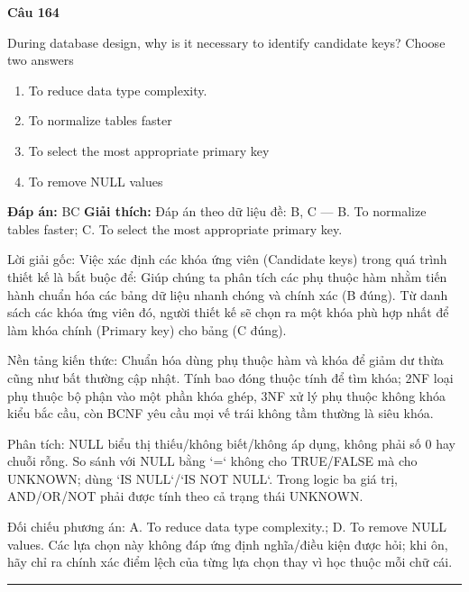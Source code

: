 \documentclass[11pt,a4paper]{article}
\newenvironment{question}[1]{%
  \par\vspace{1em}\noindent\textbf{\large Câu #1}\par\vspace{0.4em}
}{%
  \par\vspace{1em}\hrule\vspace{0.6em}
}
\newenvironment{choices}{%
  \begin{enumerate}[label=\textbf{\Alph*.},leftmargin=2.2em,itemsep=2pt,topsep=3pt]
}{%
  \end{enumerate}
}
\newcommand{\choice}{\item}
\begin{document}
\begin{question}{164}
During database design, why is it necessary to identify candidate keys? Choose two answers
\begin{choices}
\choice To reduce data type complexity.
\choice To normalize tables faster
\choice To select the most appropriate primary key
\choice To remove NULL values
\end{choices}
\textbf{Đáp án:} BC
\textbf{Giải thích:} Đáp án theo dữ liệu đề: B, C — B. To normalize tables faster; C. To select the most appropriate primary key.

Lời giải gốc: Việc xác định các khóa ứng viên (Candidate keys) trong quá trình thiết kế là bắt buộc để: Giúp chúng ta phân tích các phụ thuộc hàm nhằm tiến hành chuẩn hóa các bảng dữ liệu nhanh chóng và chính xác (B đúng). Từ danh sách các khóa ứng viên đó, người thiết kế sẽ chọn ra một khóa phù hợp nhất để làm khóa chính (Primary key) cho bảng (C đúng).

Nền tảng kiến thức: Chuẩn hóa dùng phụ thuộc hàm và khóa để giảm dư thừa cũng như bất thường cập nhật. Tính bao đóng thuộc tính để tìm khóa; 2NF loại phụ thuộc bộ phận vào một phần khóa ghép, 3NF xử lý phụ thuộc không khóa kiểu bắc cầu, còn BCNF yêu cầu mọi vế trái không tầm thường là siêu khóa.

Phân tích: NULL biểu thị thiếu/không biết/không áp dụng, không phải số 0 hay chuỗi rỗng. So sánh với NULL bằng `=` không cho TRUE/FALSE mà cho UNKNOWN; dùng `IS NULL`/`IS NOT NULL`. Trong logic ba giá trị, AND/OR/NOT phải được tính theo cả trạng thái UNKNOWN.

Đối chiếu phương án: A. To reduce data type complexity.; D. To remove NULL values. Các lựa chọn này không đáp ứng định nghĩa/điều kiện được hỏi; khi ôn, hãy chỉ ra chính xác điểm lệch của từng lựa chọn thay vì học thuộc mỗi chữ cái.
\end{question}
\end{document}
